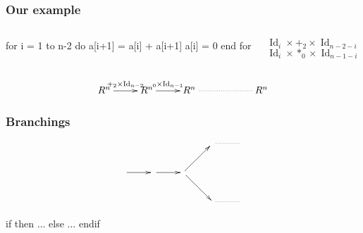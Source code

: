\documentclass[10pt]{beamer}
\DeclareMathOperator{\Id}{Id}
\begin{document}
\begin{frame}[fragile]
  \frametitle{Our example}

  \begin{columns}

    \begin{column}{0.5\textwidth}
      \begin{center}
        \begin{minipage}{0.7\textwidth}
\begin{semiverbatim}
  \alert<2>{for i = 1 to n-2 do}
    a[i+1] = a[i] + a[i+1]
    a[i] = 0
  end for
\end{semiverbatim}
        \end{minipage}
      \end{center}
    \end{column}

    \begin{column}{0.5\textwidth}
      \begin{minipage}{0.7\textwidth}
        \begin{center}
          $\phantom{ }$\\
          $\Id_{i}\times +_2 \times\Id_{n-2-i}$\\
          $\Id_i\times *_0 \times\Id_{n-1-i}$\\
        \end{center}
      \end{minipage}
    \end{column}
  \end{columns}

  \vfill

  \begin{center}
    \[\xymatrix{
      R^n\ar[r]^{+_2\times{\Id_{n-2}}} & R^n\ar[r]^{\*_0\times{\Id_{n-1}}} &
      R^{n} \ar@{.}[rr] && R^n
    }\]
  \end{center}
\end{frame}


\begin{frame}[fragile]
  \frametitle{Branchings}

  \begin{center}
    \[\xymatrix{
             &        &                 & \ar@{.}[r] & \\
      \ar[r] & \ar[r] & \ar[ru] \ar[rd] \\
             &        &                 & \ar@{.}[r] & 
    }\]
  \end{center}

  \begin{center}
    \begin{minipage}{0.7\textwidth}
\begin{semiverbatim}
  \alert<2>{if  then}
    ...
  else
    ...
  endif
\end{semiverbatim}
    \end{minipage}
  \end{center}
  
\end{frame}
\end{document}
